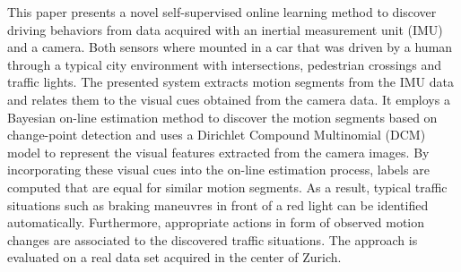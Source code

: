 This paper presents a novel self-supervised online learning method to
discover driving behaviors from data acquired with an inertial
measurement unit (IMU) and a camera. Both sensors where mounted in a
car that was driven by a human through a typical city environment with
intersections, pedestrian crossings and traffic lights. The presented
system extracts motion segments from the IMU data and relates them to
the visual cues obtained from the camera data. It employs a Bayesian
on-line estimation method to discover the motion segments based on
change-point detection and uses a Dirichlet Compound Multinomial (DCM)
model to represent the visual features extracted from the camera
images. By incorporating these visual cues into the on-line estimation
process, labels are computed that are equal for similar motion
segments. As a result, typical traffic situations such as braking
maneuvres in front of a red light can be identified
automatically. Furthermore, appropriate actions in form of observed
motion changes are associated to the discovered traffic
situations. The approach is evaluated on a real data set acquired in
the center of Zurich.

